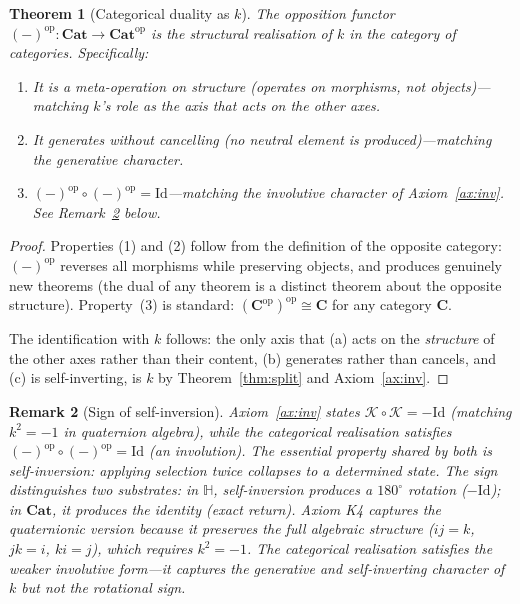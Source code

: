 \documentclass[11pt,a4paper]{article}
\newtheorem{theorem}{Theorem}
\newtheorem{remark}[theorem]{Remark}
\newcommand{\recu}[1]{{\color{kcolor}#1}}
\def\recu#1{#1}%
\begin{document}
\begin{theorem}[Categorical duality as $\recu{k}$]
\label{thm:catdual}
The opposition functor $(-)^{\mathrm{op}}: \mathbf{Cat} \to
\mathbf{Cat}^{\mathrm{op}}$ is the structural realisation of
$\recu{k}$ in the category of categories. Specifically:
\begin{enumerate}[nosep]
  \item It is a meta-operation on structure (operates on morphisms, not objects)---matching $\recu{k}$'s role as the axis that acts on the other axes.
  \item It generates without cancelling (no neutral element is produced)---matching the generative character.
  \item $(-)^{\mathrm{op}} \circ (-)^{\mathrm{op}} = \mathrm{Id}$---matching the involutive character of Axiom~\ref{ax:inv}. See Remark~\ref{rem:sign} below.
\end{enumerate}
\end{theorem}

\begin{proof}
Properties (1) and (2) follow from the definition of the opposite
category: $(-)^{\mathrm{op}}$ reverses all morphisms while preserving
objects, and produces genuinely new theorems (the dual of any theorem
is a distinct theorem about the opposite structure). Property~(3) is
standard: $(\mathbf{C}^{\mathrm{op}})^{\mathrm{op}} \cong \mathbf{C}$
for any category $\mathbf{C}$.

The identification with $\recu{k}$ follows: the only axis that (a)
acts on the \emph{structure} of the other axes rather than their
content, (b) generates rather than cancels, and (c) is self-inverting,
is $\recu{k}$ by Theorem~\ref{thm:split} and Axiom~\ref{ax:inv}.
\end{proof}

\begin{remark}[Sign of self-inversion]
\label{rem:sign}
Axiom~\ref{ax:inv} states $\mathcal{K} \circ \mathcal{K} = -\mathrm{Id}$
(matching $k^2 = -1$ in quaternion algebra), while the categorical
realisation satisfies $(-)^{\mathrm{op}} \circ (-)^{\mathrm{op}} =
\mathrm{Id}$ (an involution). The essential property shared by both is
\emph{self-inversion}: applying selection twice collapses to a
determined state. The sign distinguishes two substrates: in
$\mathbb{H}$, self-inversion produces a $180^\circ$ rotation
($-\mathrm{Id}$); in $\mathbf{Cat}$, it produces the identity (exact
return). Axiom K4 captures the quaternionic version because it preserves
the full algebraic structure ($ij = k$, $jk = i$, $ki = j$), which
requires $k^2 = -1$. The categorical realisation satisfies the weaker
involutive form---it captures the generative and self-inverting character
of $\recu{k}$ but not the rotational sign.
\end{remark}
\end{document}
